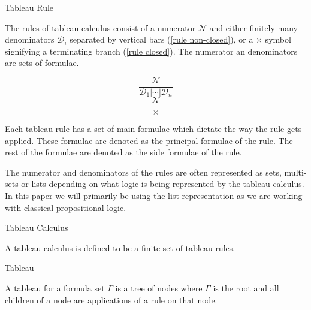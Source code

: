 \documentclass{llncs}
\newcommand{\comment}[1]{}
\begin{document}
\begin{definition}{Tableau Rule}\label{Tableau Rule}

The rules of tableau calculus consist of a numerator $\mathcal{N}$ and
either finitely many denominators $\mathcal{D}_i$ separated by vertical bars
(\ref{rule non-closed}), or a $\times$ symbol signifying a terminating branch
(\ref{rule closed}).  The numerator an denominators are sets of formulae.
%
\comment{
The rules of a tableau calculus are expressed as sets, multi-sets or lists
depending on the logic being expressed. We will express the tableau rules as a
list as we are primarily working with classical propositional logic. A rule is
composed of a numerator and a denominator. A numerator $\mathcal{N}$ is a set
of formulae in the logical system $L$. A denominator is either a set of
branches, $\mathcal{D}_i$, which are each sets of formulae in $L$ or the symbol
$\times$ signifying a closed tableau, indicated the termination of a branch.
These rules are typically written as the following where (\ref{rule
non-closed}) represents a rule with a denominator as a set of formulae and
(\ref{rule closed}) represents a rule which results in a closed branch,
}
%
\begin{multicols}{2}
\noindent
\begin{equation}
\frac{\mathcal{N}}{\mathcal{D}_1 \vert \cdots \vert \mathcal{D}_n}
\label{rule non-closed}
\end{equation}
\begin{equation}
\frac{\mathcal{N}}{\times}
\label{rule closed}
\end{equation}
\end{multicols}
%
Each tableau rule has a set of main formulae which dictate the way the rule
gets applied. These formulae are denoted as the \underline{principal formulae}
of the rule. The rest of the formulae are denoted as the \underline{side
formulae} of the rule.

The numerator and denominators of the rules are often represented as sets,
multi-sets or lists depending on what logic is being represented by the tableau
calculus. In this paper we will primarily be using the list representation as
we are working with classical propositional logic.
\end{definition}
\begin{definition}{Tableau Calculus}

A tableau calculus is defined to be a finite set of tableau rules.
\end{definition}
\begin{definition}{Tableau}

A tableau for a formula set $\Gamma$ is a tree of nodes where $\Gamma$ is the
root and all children of a node are applications of a rule on that node.
\end{definition}
\end{document}
